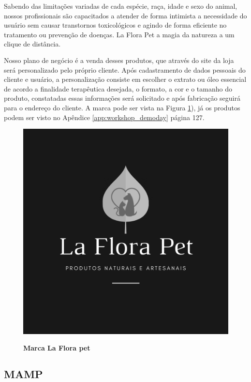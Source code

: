 Sabendo das limitações variadas de cada espécie, raça, idade e sexo do animal, nossos profissionais são capacitados a atender de forma intimista a necessidade do usuário sem causar transtornos toxicológicos e agindo de forma eficiente no tratamento ou prevenção de doenças. La Flora Pet a magia da natureza a um clique de distância.

Nosso plano de negócio é a venda desses produtos, que através do site da loja será personalizado pelo próprio cliente. Após cadastramento de dados pessoais do cliente e usuário, a personalização consiste em escolher o extrato ou óleo essencial de acordo a finalidade terapêutica desejada, o formato, a cor e o tamanho do produto, constatadas essas informações será solicitado e após fabricação seguirá para o endereço do cliente. A marca pode ser vista na Figura \ref{figura_24}), já os produtos podem ser visto no Apêndice \ref{app:workshop_demoday} página 127.


\begin{figure}[H]
\centering
\caption{\textbf{Marca La Flora pet}}
\includegraphics[scale=5]{Imagens/laflorapet.png}
\label{figura_24}
\end{figure}



\subsection{MAMP}

